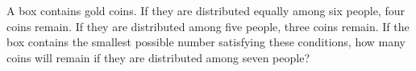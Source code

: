 A box contains gold coins. If they are distributed equally among six people, four coins remain. If they are distributed among five people, three coins remain. If the box contains the smallest possible number satisfying these conditions, how many coins will remain if they are distributed among seven people?
